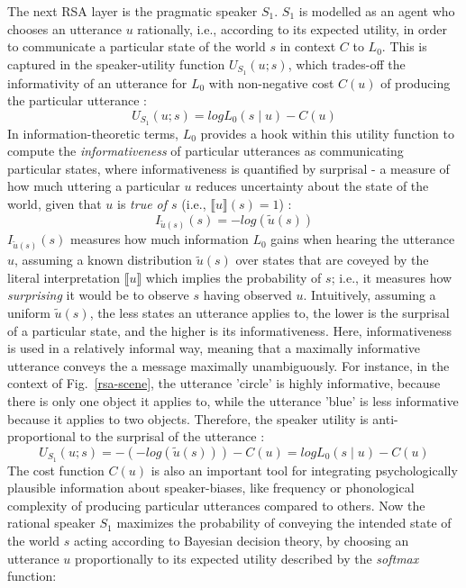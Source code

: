 The next RSA layer is the pragmatic speaker $S_1$. $S_1$ is modelled as an agent who chooses an utterance $u$ rationally, i.e., according to its expected utility, in order to communicate a particular state of the world $s$ in context $C$ to $L_0$. This is captured in the speaker-utility function $U_{S_1}(u; s)$, which trades-off the informativity of an utterance for $L_0$ with non-negative cost $C(u)$ of producing the particular utterance \parencite{problang}:
\begin{equation}
U_{S_1} (u;s) = log L_0(s \mid u) - C(u)
\end{equation}
In information-theoretic terms, $L_0$ provides a hook within this utility function to compute the \emph{informativeness} of particular utterances as communicating particular states, 
where informativeness is quantified by surprisal - a measure of how much uttering a particular $u$ reduces uncertainty about the state of the world, given that $u$ is \emph{true of $s$} (i.e., $\llbracket u \rrbracket (s) = 1$) \parencite{frank2012predicting}: 
\begin{equation}
I_{ \tilde{u} (s)}(s) = -log(\tilde{u} (s))
\end{equation}
$I_{\tilde{u} (s)}(s)$ measures how much information $L_0$ gains when hearing the utterance $u$, assuming a known distribution $\tilde{u} (s)$ over states that are coveyed by the literal interpretation $\llbracket u \rrbracket$ which implies the probability of $s$; i.e., it measures how \emph{surprising} it would be to observe $s$ having observed $u$.
Intuitively, assuming a uniform $\tilde{u} (s)$, the less states an utterance applies to, the lower is the surprisal of a particular state, and the higher is its informativeness. Here, informativeness is used in a relatively informal way, meaning that a maximally informative utterance conveys the a message maximally unambiguously. For instance, in the context of Fig.~\ref{rsa-scene}, the utterance 'circle' is highly informative, because there is only one object it applies to, while the utterance 'blue' is less informative because it applies to two objects. 
Therefore, the speaker utility is anti-proportional to the surprisal of the utterance \parencite{frank2012predicting}:
\begin{equation}
U_{S_1} (u;s) = -(-log(\tilde{u}(s))) - C(u) = log L_0(s \mid u) - C(u)
\end{equation}
The cost function $C(u)$ is also an important tool for integrating psychologically plausible information about speaker-biases, like frequency or phonological complexity of producing particular utterances compared to others. Now the rational speaker $S_1$ maximizes the probability of conveying the intended state of the world $s$ acting according to Bayesian decision theory, by choosing an utterance $u$ proportionally to its expected utility described by the \emph{softmax} function:
